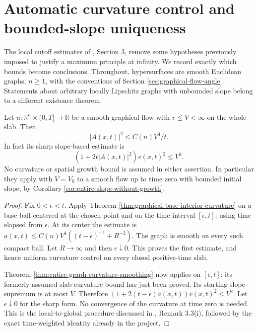 \chapter{Automatic curvature control and bounded-slope uniqueness}\label{sec:graphical-global-refinements}
The local cutoff estimates of \cite{EH91}, Section 3, remove some hypotheses previously imposed to justify a maximum principle at infinity. We record exactly which bounds become conclusions. Throughout, hypersurfaces are smooth Euclidean graphs, $n\geq1$, with the conventions of Section \ref{sec:graphical-flow-angle}. Statements about arbitrary locally Lipschitz graphs with unbounded slope belong to a different existence theorem.

\begin{proposition}\label{prop:bounded-slope-automatic-curvature}
Let $u:\mathbb R^n\times(0,T]\to\mathbb R$ be a smooth graphical flow with $v\leq V<\infty$ on the whole slab. Then
\[
 |A(x,t)|^2\leq C(n)V^4/t.
\]
In fact its sharp slope-based estimate is
\[
 (1+2t|A(x,t)|^2)v(x,t)^2\leq V^2.
\]
No curvature or spatial growth bound is assumed in either assertion. In particular they apply with $V=V_0$ to a smooth flow up to time zero with bounded initial slope, by Corollary \ref{cor:entire-slope-without-growth}.
\end{proposition}
\begin{proof}
Fix $0<\epsilon<t$. Apply Theorem \ref{thm:graphical-base-interior-curvature} on a base ball centered at the chosen point and on the time interval $[\epsilon,t]$, using time elapsed from $\epsilon$. At its center the estimate is $a(x,t)\leq C(n)V^4((t-\epsilon)^{-1}+R^{-2})$. The graph is smooth on every such compact ball. Let $R\to\infty$ and then $\epsilon\downarrow0$. This proves the first estimate, and hence uniform curvature control on every closed positive-time slab.

Theorem \ref{thm:entire-graph-curvature-smoothing} now applies on $[\epsilon,t]$: its formerly assumed slab curvature bound has just been proved. Its starting slope supremum is at most $V$. Therefore $(1+2(t-\epsilon)a(x,t))v(x,t)^2\leq V^2$. Let $\epsilon\downarrow0$ for the sharp form. No convergence of the curvature at time zero is needed. This is the local-to-global procedure discussed in \cite{EH91}, Remark 3.3(i), followed by the exact time-weighted identity already in the project.
\end{proof}

